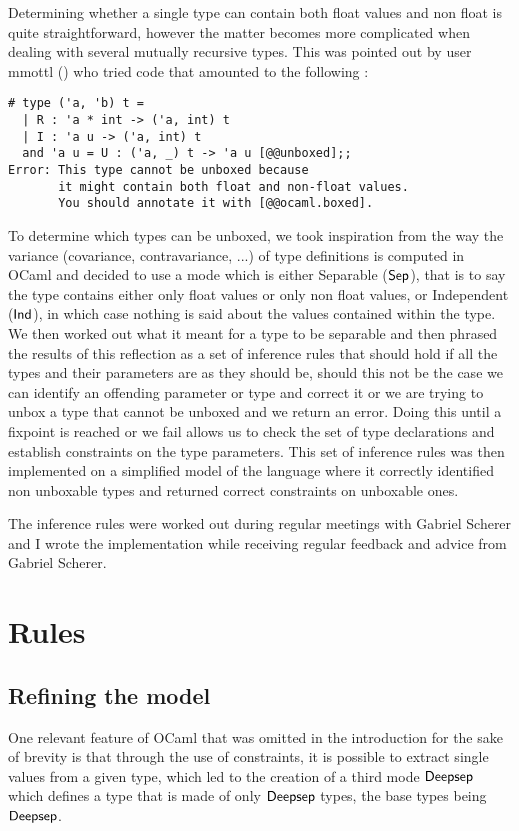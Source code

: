 \documentclass[a4]{article}
\begin{document}
Determining whether a single type can contain both float values and non float is quite straightforward, however the matter becomes more complicated when dealing with several mutually recursive types. This was pointed out by user mmottl () who tried code that amounted to the following :

\begin{lstlisting}
# type ('a, 'b) t =
  | R : 'a * int -> ('a, int) t
  | I : 'a u -> ('a, int) t
  and 'a u = U : ('a, _) t -> 'a u [@@unboxed];;
Error: This type cannot be unboxed because
       it might contain both float and non-float values.
       You should annotate it with [@@ocaml.boxed].
\end{lstlisting}

To determine which types can be unboxed, we took inspiration from the way the variance (covariance, contravariance, ...) of type definitions is computed in OCaml and decided to use a mode which is either Separable ($\mathsf{Sep}$), that is to say the type contains either only float values or only non float values, or {Independent} ($\mathsf{Ind}$), in which case nothing is said about the values contained within the type. We then worked out what it meant for a type to be separable and then phrased the results of this reflection as a set of inference rules that should hold if all the types and their parameters are as they should be, should this not be the case we can identify an offending parameter or type and correct it or we are trying to unbox a type that cannot be unboxed and we return an error. Doing this until a fixpoint is reached or we fail allows us to check the set of type declarations and establish constraints on the type parameters. This set of inference rules was then implemented on a simplified model of the language where it correctly identified non unboxable types and returned correct constraints on unboxable ones.

The inference rules were worked out during regular meetings with Gabriel Scherer and I wrote the implementation while receiving regular feedback and advice from Gabriel Scherer.

\section{Rules}

\subsection{Refining the model}
One relevant feature of OCaml that was omitted in the introduction for the sake of brevity is that through the use of constraints, it is possible to extract single values from a given type, which led to the creation of a third mode $\mathsf{Deepsep}$ which defines a type that is made of only $\mathsf{Deepsep}$ types, the base types being $\mathsf{Deepsep}$.
\end{document}
